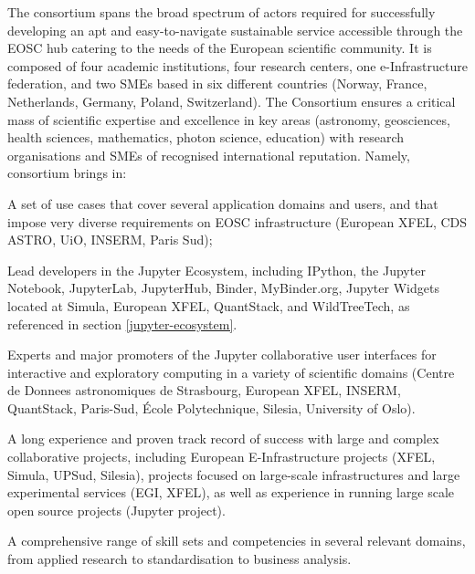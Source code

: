 The \TheProject consortium spans the broad spectrum of actors required
for successfully developing an apt and easy-to-navigate sustainable service
accessible through the EOSC hub catering to the needs of the European
scientific community. It is composed of four academic institutions, four research
centers, one e-Infrastructure federation, and two SMEs based in six different countries (Norway, France,
Netherlands, Germany, Poland, Switzerland).
The Consortium ensures a critical mass of scientific expertise and excellence
in key areas (astronomy, geosciences, health sciences,
mathematics, photon science, education) with research organisations and SMEs of recognised
 international reputation. Namely, \TheProject consortium brings in:
\begin{compactitem}
\item A set of use cases that cover several application domains and users, and that impose very diverse
requirements on EOSC infrastructure (European XFEL, CDS ASTRO, UiO, INSERM, Paris Sud);
\item Lead developers in the Jupyter Ecosystem, including IPython, the Jupyter Notebook, JupyterLab,
JupyterHub, Binder, MyBinder.org, Jupyter Widgets located at Simula, European XFEL, QuantStack, and
WildTreeTech,
as referenced in section \ref{jupyter-ecosystem}.
\item Experts and major promoters of the Jupyter collaborative user interfaces for interactive and exploratory
computing in a variety of scientific domains (Centre de Donnees
astronomiques de Strasbourg, European XFEL,
INSERM, QuantStack, Paris-Sud, \'Ecole Polytechnique, Silesia,
University of Oslo).
\item A long experience and proven track record of success with large and complex collaborative projects,
including
European E-Infrastructure projects (XFEL, Simula, UPSud, Silesia),
projects focused on large-scale infrastructures and large experimental services (EGI, XFEL),
as well as experience in running large scale open source projects (Jupyter project).
\item A comprehensive range of skill sets and competencies in several relevant domains, from applied
research to standardisation to business
analysis.
\end{compactitem}

